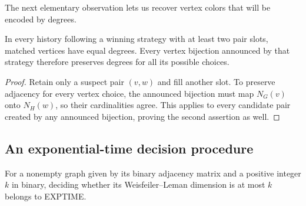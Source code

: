 The next elementary observation lets us recover vertex colors that
will be encoded by degrees.

\begin{lemma}
\label{lem:degree}
In every history following a winning strategy with at least two pair
slots, matched vertices have equal degrees. Every vertex bijection
announced by that strategy therefore preserves degrees for all its
possible choices.
\end{lemma}

\begin{proof}
Retain only a suspect pair $(v,w)$ and fill another slot. To preserve
adjacency for every vertex choice, the announced bijection must map
$N_G(v)$ onto $N_H(w)$, so their cardinalities agree. This applies to
every candidate pair created by any announced bijection, proving
the second assertion as well.
\end{proof}

\subsection{An exponential-time decision procedure}

\begin{proposition}
\label{prop:upper}
For a nonempty graph given by its binary adjacency matrix and a
positive integer $k$ in binary, deciding whether its
Weisfeiler--Leman dimension is at most $k$ belongs to EXPTIME.
\end{proposition}

